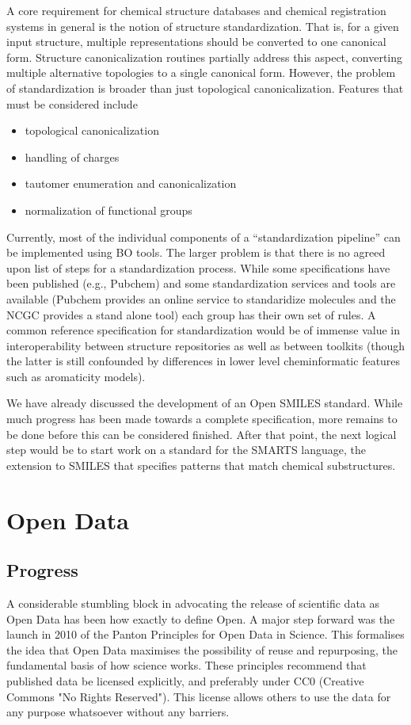 \documentclass[10pt]{bmc_article}
\newenvironment{bmcformat}{\begin{raggedright}\baselineskip20pt\sloppy\setboolean{publ}{false}}{\end{raggedright}\baselineskip20pt\sloppy}
\begin{document}
\begin{bmcformat}
A core requirement for chemical structure databases and chemical
registration systems in general is the notion of structure
standardization.  That is,  for a given input structure, multiple
representations should be converted to one canonical form. 
Structure canonicalization routines partially address this aspect,
converting multiple alternative topologies to a single canonical
form. However, the problem of standardization is broader than just
topological canonicalization. Features that must be considered include
\begin{itemize}
\item topological canonicalization
\item handling of charges
\item tautomer enumeration and canonicalization
\item normalization of functional groups
\end{itemize}
Currently, most of the individual components of a ``standardization
pipeline'' can be implemented using BO tools. The larger problem is
that there is no agreed upon list of steps for a standardization
process. While some specifications have been published (e.g., Pubchem)
and some standardization services and tools are available (Pubchem
provides an online service to standaridize molecules and the NCGC
provides a stand alone tool) each group has their own set of rules. A
common reference specification for standardization would be of immense
value in interoperability between structure repositories as well as
between toolkits (though the latter is still confounded by differences
in lower level cheminformatic features such as aromaticity models).

We have already discussed the development of an Open SMILES standard. While much progress has been made towards a complete specification, more remains to be done before this can be considered finished. After that point, the next logical step would be to start work on a standard for the SMARTS language, the extension to SMILES that specifies patterns that match chemical substructures.

\section*{Open Data}
  \subsection*{Progress}

A considerable stumbling block in advocating the release of scientific
data as Open Data has been how exactly to define Open. A major step
forward was the launch in 2010 of the Panton Principles for Open Data
in Science. This formalises the idea that Open Data maximises the
possibility of reuse and repurposing, the fundamental basis
of how science works. These principles recommend that published data
be licensed explicitly, and preferably under CC0 (Creative Commons "No
Rights Reserved"). This license allows others to use the data for any
purpose whatsoever without any barriers.


\end{bmcformat}
\end{document}
